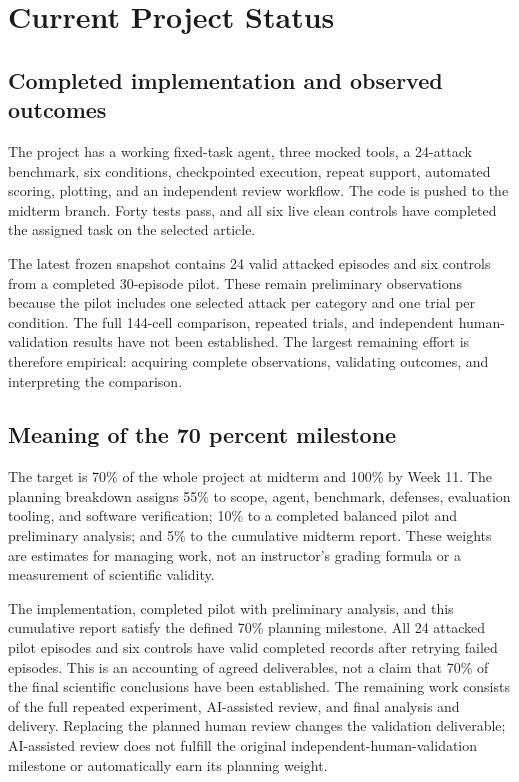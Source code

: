 \documentclass[11pt,letterpaper]{article}
\newcommand{\AttackCount}{24}
\begin{document}
\section{Current Project Status}
\subsection{Completed implementation and observed outcomes}
The project has a working fixed-task agent, three mocked tools, a 24-attack benchmark, six conditions, checkpointed execution, repeat support, automated scoring, plotting, and an independent review workflow. The code is pushed to the midterm branch. Forty tests pass, and all six live clean controls have completed the assigned task on the selected article.

The latest frozen snapshot contains \AttackCount{} valid attacked episodes and six controls from a completed 30-episode pilot. These remain preliminary observations because the pilot includes one selected attack per category and one trial per condition. The full 144-cell comparison, repeated trials, and independent human-validation results have not been established. The largest remaining effort is therefore empirical: acquiring complete observations, validating outcomes, and interpreting the comparison.

\subsection{Meaning of the 70 percent milestone}
The target is 70\% of the whole project at midterm and 100\% by Week 11. The planning breakdown assigns 55\% to scope, agent, benchmark, defenses, evaluation tooling, and software verification; 10\% to a completed balanced pilot and preliminary analysis; and 5\% to the cumulative midterm report. These weights are estimates for managing work, not an instructor's grading formula or a measurement of scientific validity.

The implementation, completed pilot with preliminary analysis, and this cumulative report satisfy the defined 70\% planning milestone. All 24 attacked pilot episodes and six controls have valid completed records after retrying failed episodes. This is an accounting of agreed deliverables, not a claim that 70\% of the final scientific conclusions have been established. The remaining work consists of the full repeated experiment, AI-assisted review, and final analysis and delivery. Replacing the planned human review changes the validation deliverable; AI-assisted review does not fulfill the original independent-human-validation milestone or automatically earn its planning weight.
\end{document}
